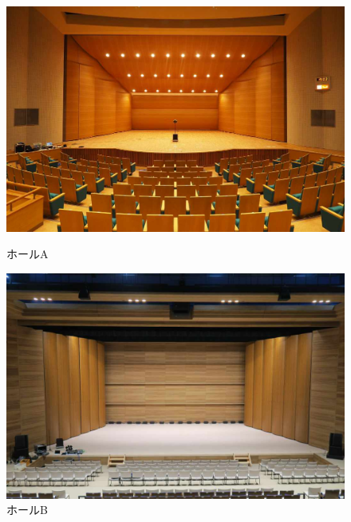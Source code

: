 \documentclass[11pt,a4j]{jreport}
\begin{document}
\newpage
\begin{figure}[H]
  \centering
  \begin{minipage}[b]{.5\textwidth}
    \centering
    \includegraphics[width=.9\linewidth]{images/measuredHalls/w90h60/picture_a.jpg}
    \caption*{ホールA}
  \end{minipage}%
  \begin{minipage}[b]{.5\textwidth}
    \centering
    \includegraphics[width=.9\linewidth]{images/measuredHalls/w90h60/picture_b.jpg}
    \caption*{ホールB}
  \end{minipage}


\end{figure}
\end{document}
